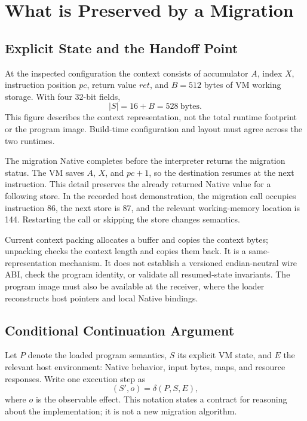 \documentclass[conference,letterpaper]{IEEEtran}
\begin{document}
\section{What is Preserved by a Migration}
\subsection{Explicit State and the Handoff Point}
At the inspected configuration the context consists of accumulator $A$, index $X$, instruction position $pc$, return value $ret$, and $B=512$ bytes of VM working storage. With four 32-bit fields,
\begin{equation}
|S|=16+B=528\ \text{bytes}.
\end{equation}
This figure describes the context representation, not the total runtime footprint or the program image. Build-time configuration and layout must agree across the two runtimes.

The migration Native completes before the interpreter returns the migration status. The VM saves $A$, $X$, and $pc+1$, so the destination resumes at the next instruction. This detail preserves the already returned Native value for a following store. In the recorded host demonstration, the migration call occupies instruction 86, the next store is 87, and the relevant working-memory location is 144. Restarting the call or skipping the store changes semantics.

Current context packing allocates a buffer and copies the context bytes; unpacking checks the context length and copies them back. It is a same-representation mechanism. It does not establish a versioned endian-neutral wire ABI, check the program identity, or validate all resumed-state invariants. The program image must also be available at the receiver, where the loader reconstructs host pointers and local Native bindings.

\subsection{Conditional Continuation Argument}
Let $P$ denote the loaded program semantics, $S$ its explicit VM state, and $E$ the relevant host environment: Native behavior, input bytes, maps, and resource responses. Write one execution step as
\begin{equation}
(S',o)=\delta(P,S,E),
\end{equation}
where $o$ is the observable effect. This notation states a contract for reasoning about the implementation; it is not a new migration algorithm.
\end{document}
